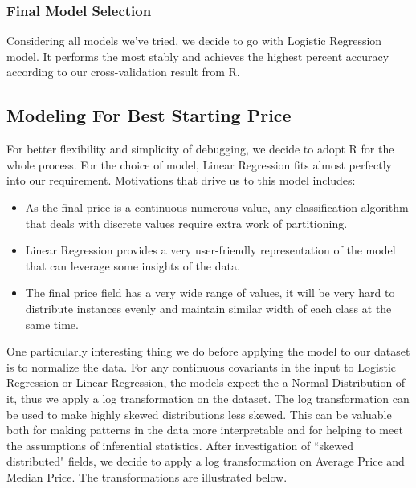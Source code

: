 \documentclass[CEJM,PDF]{cej} %
\begin{document}
\subsubsection{Final Model Selection}
Considering all models we've tried, we decide to go with Logistic Regression model. It performs the most stably and achieves the highest percent accuracy according to our cross-validation result from R.\\

\subsection{Modeling For Best Starting Price}
For better flexibility and simplicity of debugging, we decide to adopt R for the whole process. For the choice of model, Linear Regression fits almost perfectly into our requirement. Motivations that drive us to this model includes:
\begin{itemize}
\item As the final price is a continuous numerous value, any classification algorithm that deals with discrete values require extra work of partitioning.
\item Linear Regression provides a very user-friendly representation of the model that can leverage some insights of the data.
\item The final price field has a very wide range of values, it will be very hard to distribute instances evenly and maintain similar width of each class at the same time.
\end{itemize}

One particularly interesting thing we do before applying the model to our dataset is to normalize the data. For any continuous covariants in the input to Logistic Regression or Linear Regression, the models expect the a Normal Distribution of it, thus we apply a log transformation on the dataset. The log transformation can be used to make highly skewed distributions less skewed. This can be valuable both for making patterns in the data more interpretable and for helping to meet the assumptions of inferential statistics. After investigation of ``skewed distributed" fields, we decide to apply a log transformation on Average Price and Median Price. The transformations are illustrated below.\\
\end{document}
